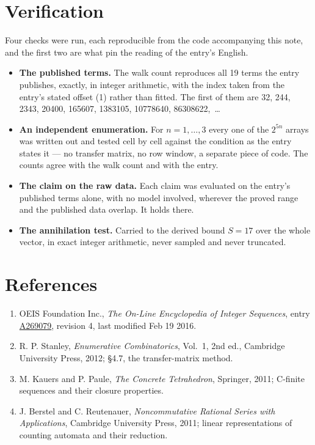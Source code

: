 \documentclass[11pt]{article}
\theoremstyle{definition}
\begin{document}
\section{Verification}

Four checks were run, each reproducible from the code accompanying this note, and the first two are what pin the reading of the entry's English.

\begin{itemize}

\item {\bfseries The published terms.} The walk count reproduces all 19 terms the entry publishes, exactly, in integer arithmetic, with the index taken from the entry's stated offset (1) rather than fitted. The first of them are 32, 244, 2343, 20400, 165607, 1383105, 10778640, 86308622,~\dots

\item {\bfseries An independent enumeration.} For $n = 1,\dots,3$ every one of the $2^{5n}$ arrays was written out and tested cell by cell against the condition as the entry states it --- no transfer matrix, no row window, a separate piece of code. The counts agree with the walk count and with the entry.

\item {\bfseries The claim on the raw data.} Each claim was evaluated on the entry's published terms alone, with no model involved, wherever the proved range and the published data overlap. It holds there.

\item {\bfseries The annihilation test.} Carried to the derived bound $S = 17$ over the whole vector, in exact integer arithmetic, never sampled and never truncated.

\end{itemize}

\section{References}

\begin{enumerate}

\item OEIS Foundation Inc., \emph{The On-Line Encyclopedia of Integer Sequences}, entry \href{https://oeis.org/A269079}{A269079}, revision 4, last modified Feb 19 2016.

\item R. P. Stanley, \emph{Enumerative Combinatorics}, Vol.~1, 2nd ed., Cambridge University Press, 2012; \S4.7, the transfer-matrix method.

\item M. Kauers and P. Paule, \emph{The Concrete Tetrahedron}, Springer, 2011; C-finite sequences and their closure properties.

\item J. Berstel and C. Reutenauer, \emph{Noncommutative Rational Series with Applications}, Cambridge University Press, 2011; linear representations of counting automata and their reduction.

\end{enumerate}
\end{document}
